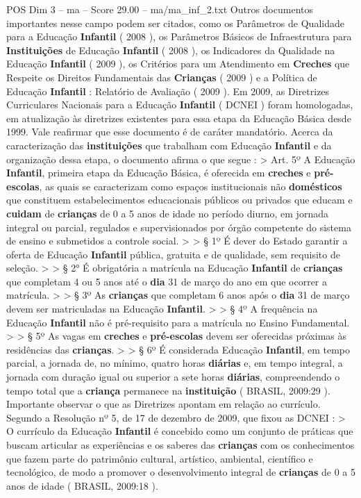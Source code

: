 \begin{textsample}{POS Dim 3 – ma – Score 29.00 – ma/ma\_inf\_2.txt}
Outros documentos importantes nesse campo podem ser citados, como os Parâmetros de Qualidade para a Educação \textbf{Infantil} ( 2008 ), os Parâmetros Básicos de Infraestrutura para \textbf{Instituições} de Educação \textbf{Infantil} ( 2008 ), os Indicadores da Qualidade na Educação \textbf{Infantil} ( 2009 ), os Critérios para um Atendimento em \textbf{Creches} que Respeite os Direitos Fundamentais das \textbf{Crianças} ( 2009 ) e a Política de Educação \textbf{Infantil} : Relatório de Avaliação ( 2009 ).
Em 2009, as Diretrizes Curriculares Nacionais para a Educação \textbf{Infantil} ( DCNEI ) foram homologadas, em atualização às diretrizes existentes para essa etapa da Educação Básica desde 1999.
Vale reafirmar que esse documento é de caráter mandatório.
Acerca da caracterização das \textbf{instituições} que trabalham com Educação \textbf{Infantil} e da organização dessa etapa, o documento afirma o que segue : > Art. 5º A Educação \textbf{Infantil}, primeira etapa da Educação Básica, é oferecida em \textbf{creches} e \textbf{pré-escolas}, as quais se caracterizam como espaços institucionais não \textbf{domésticos} que constituem estabelecimentos educacionais públicos ou privados que educam e \textbf{cuidam} de \textbf{crianças} de 0 a 5 anos de idade no período diurno, em jornada integral ou parcial, regulados e supervisionados por órgão competente do sistema de ensino e submetidos a controle social. > > § 1º É dever do Estado garantir a oferta de Educação \textbf{Infantil} pública, gratuita e de qualidade, sem requisito de seleção. > > § 2{\EmojiFont °} É obrigatória a matrícula na Educação \textbf{Infantil} de \textbf{crianças} que completam 4 ou 5 anos até o \textbf{dia} 31 de março do ano em que ocorrer a matrícula. > > § 3º As \textbf{crianças} que completam 6 anos após o \textbf{dia} 31 de março devem ser matriculadas na Educação \textbf{Infantil}. > > § 4º A frequência na Educação \textbf{Infantil} não é pré-requisito para a matrícula no Ensino Fundamental. > > § 5º As vagas em \textbf{creches} e \textbf{pré-escolas} devem ser oferecidas próximas às residências das \textbf{crianças}. > > § 6º É considerada Educação \textbf{Infantil}, em tempo parcial, a jornada de, no mínimo, quatro horas \textbf{diárias} e, em tempo integral, a jornada com duração igual ou superior a sete horas \textbf{diárias}, compreendendo o tempo total que a \textbf{criança} permanece na \textbf{instituição} ( BRASIL, 2009:29 ).
Importante observar o que as Diretrizes apontam em relação ao currículo.
Segundo a Resolução nº 5, de 17 de dezembro de 2009, que fixou as DCNEI : > O currículo da Educação \textbf{Infantil} é concebido como um conjunto de práticas que buscam articular as experiências e os saberes das \textbf{crianças} com os conhecimentos que fazem parte do patrimônio cultural, artístico, ambiental, científico e tecnológico, de modo a promover o desenvolvimento integral de \textbf{crianças} de 0 a 5 anos de idade ( BRASIL, 2009:18 ).

\end{textsample}

